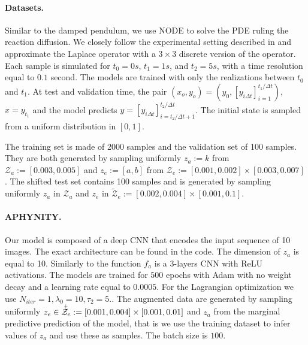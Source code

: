 \documentclass{article}
\begin{document}
\paragraph{Datasets.}
Similar to the damped pendulum, we use NODE to solve the PDE ruling the reaction diffusion. We closely follow the experimental setting described in \citet{APHYNITY} and approximate the Laplace operator with a $3 \times 3$ discrete version of the operator. Each sample is simulated for $t_0=0s$, $t_1=1s$, and $t_2=5s$, with a time resolution equal to $0.1$ second. The models are trained with only the realizations between $t_0$ and $t_1$. At test and validation time, the pair $(x_o, y_o) = (y_0, [y_{i\Delta t}]_{i=1}^{t_1 \!/\! \Delta t})$, $x=y_{t_1}$ and the model predicts $y=[y_{i\Delta t}]_{i=t_2 \!/\! \Delta t + 1}^{t_2 \!/\! \Delta t}$. The initial state is sampled from a uniform distribution in $\left[0, 1\right]$.

The training set is made of 2000 samples and the validation set of 100 samples. They are both generated by sampling uniformly $z_a := k$ from $\mathcal{Z}_a := \left[ 0.003, 0.005 \right]$ and $z_e := \left[a, b\right]$ from $\mathcal{Z}_e := \left[ 0.001, 0.002 \right] \times \left[ 0.003, 0.007 \right]$. The shifted test set contains 100 samples and is generated by sampling uniformly $z_a$ in $\mathcal{Z}_a$ and $z_e$ in $\tilde{\mathcal{Z}}_e := \left[ 0.002, 0.004 \right] \times \left[ 0.001, 0.1 \right]$.
\paragraph{APHYNITY.}
Our model is composed of a deep CNN that encodes the input sequence of 10 images. The exact architecture can be found in the code. The dimension of $z_a$ is equal to 10. Similarly to \citet{APHYNITY} the function $f_a$ is a 3-layers CNN with ReLU activations. The models are trained for $500$ epochs with Adam with no weight decay and a learning rate equal to $0.0005$. For the Lagrangian optimization we use $N_{iter}=1, \lambda_0=10, \tau_2 = 5.$. The augmented data are generated by sampling uniformly $z_e \in \accentset{+}{\mathcal{Z}}_e := \left[0.001, 0.004\right] \times \left[0.001, 0.01\right]$ and $z_a$ from the marginal predictive prediction of the model, that is we use the training dataset to infer values of $z_a$ and use these as samples. The batch size is $100$.
\end{document}
